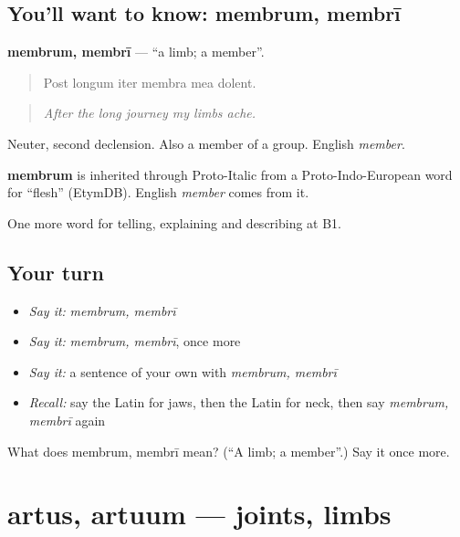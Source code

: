 \subsection*{You'll want to know: membrum, membrī}
\textbf{membrum, membrī} — \textquotedblleft{}a limb; a member\textquotedblright{}.

\begin{quote}
Post longum iter membra mea dolent.
\end{quote}

\begin{quote}
\emph{After the long journey my limbs ache.}
\end{quote}

Neuter, second declension. Also a member of a group. English \emph{member}.

\begin{cousinweb}
\textbf{membrum} is inherited through Proto-Italic from a Proto-Indo-European word for \textquotedblleft{}flesh\textquotedblright{} (EtymDB). English \emph{member} comes from it.
\end{cousinweb}

\begin{grammarlens}[title={What you've built}]
One more word for telling, explaining and describing at B1.
\end{grammarlens}

\subsection*{Your turn}
\begin{itemize}
\raggedright
  \item \emph{Say it:} \emph{membrum, membrī}
  \item \emph{Say it:} \emph{membrum, membrī}, once more
  \item \emph{Say it:} a sentence of your own with \emph{membrum, membrī}
  \item \emph{Recall:} say the Latin for jaws, then the Latin for neck, then say \emph{membrum, membrī} again
\end{itemize}

\begin{tcolorbox}[breakable,colback=teal!4,colframe=teal!35!black,title={Before you move on}]
What does membrum, membrī mean? (\textquotedblleft{}A limb; a member\textquotedblright{}.) Say it once more.
\end{tcolorbox}
\section[artus, artuum]{artus, artuum — joints, limbs}

